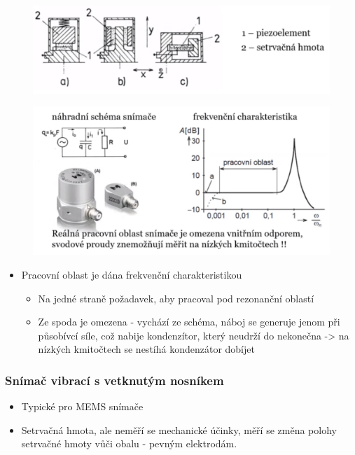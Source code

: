 \begin{figure}[h]
    \centering
    \includegraphics[scale = 0.40]{img/piezoVIB.png}
\end{figure}

\begin{figure}[h]
    \centering
    \includegraphics[scale = 0.50]{img/piezoVIB1.png}
\end{figure}

\begin{itemize}
    \item Pracovní oblast je dána frekvenční charakteristikou \begin{itemize}
              \item Na jedné straně požadavek, aby pracoval pod rezonanční oblastí
              \item Ze spoda je omezena - vychází ze schéma, náboj se generuje jenom při působívcí síle, což nabije kondenzítor, který neudrží do nekonečna -> na nízkých kmitočtech se nestíhá kondenzátor dobíjet
          \end{itemize}
\end{itemize}

\subsubsection*{Snímač vibrací s vetknutým nosníkem}
\begin{itemize}
    \item Typické pro MEMS snímače
    \item Setrvačná hmota, ale neměří se mechanické účinky, měří se změna polohy setrvačné hmoty vůči obalu - pevným elektrodám.
\end{itemize}

